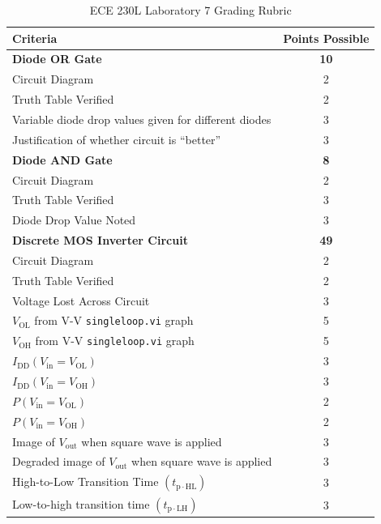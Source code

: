 \documentclass[12pt]{../manual}
\begin{document}
%
\newpage
\def\arraystretch{1.2}
{}
\hspace{0pt}
\vfill %
\begin{table}[ht!]
\caption{ECE 230L Laboratory 7 Grading Rubric}
\centering
\begin{tabular}{l|c} \hline
Criteria & Points Possible \\ \hline \hline
\textbf{Diode OR Gate}			& \textbf{10} \\
Circuit Diagram 				& 2 \\
Truth Table Verified			& 2 \\
Variable diode drop values given for different diodes & 3 \\
Justification of whether circuit is ``better'' & 3 \\ \hline
\textbf{Diode AND Gate}			& \textbf{8} \\
Circuit Diagram 				& 2 \\
Truth Table Verified			& 3 \\
Diode Drop Value Noted			& 3 \\ \hline
\textbf{Discrete MOS Inverter Circuit}		& \textbf{49} \\
Circuit Diagram 				& 2 \\
Truth Table Verified			& 2 \\
Voltage Lost Across Circuit 	& 3 \\
$V_\mathrm{OL}$ from V-V {\tt singleloop.vi} graph 	& 5 \\
$V_\mathrm{OH}$ from V-V {\tt singleloop.vi} graph	& 5 \\
$I_\mathrm{DD}(V_\mathrm{in} = V_\mathrm{OL})$ & 3 \\
$I_\mathrm{DD}(V_\mathrm{in} = V_\mathrm{OH})$ & 3 \\
$P(V_\mathrm{in} = V_\mathrm{OL})$ & 2 \\
$P(V_\mathrm{in} = V_\mathrm{OH})$ & 2 \\
Image of $V_\mathrm{out}$ when square wave is applied & 3 \\
Degraded image of $V_\mathrm{out}$ when square wave is applied & 3 \\
High-to-Low Transition Time $(t_\mathrm{p \cdot HL})$ & 3 \\
Low-to-high transition time $(t_\mathrm{p \cdot LH})$ & 3 \\

\end{tabular}
\end{table}
\end{document}
